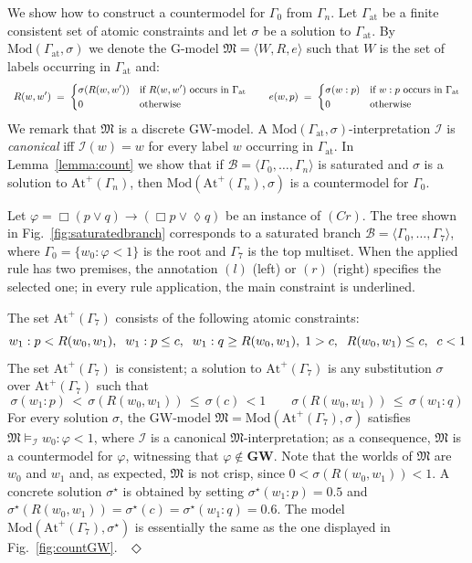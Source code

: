 \documentclass[copyright,creativecommons]{eptcs}
\newcommand{\GWL}{\mathbf{GW}}
\newcommand{\GM}{\mbox{$\mathrm{G}$}}
\newcommand{\GWM}{\mbox{$\mathrm{GW}$}}
\newcommand{\Diam}{\lozenge}
\newcommand{\Gat}{\G_\mathrm{at}}
\newcommand{\stru}[1]{\langle #1 \rangle} %
\newcommand{\Atmp}[1]{\mathrm{At}^{+}\!(#1)}
\newcommand{\Modname}{\mathrm{Mod}}
\newcommand{\Mod}[1]{\Modname(#1)}
\newcommand{\M}{\mathfrak{M}}
\newcommand{\s}{\sigma}
\newcommand{\G}{\Gamma}
\newcommand{\Bcal}{\mathcal{B}}
\newcommand{\Ical}{\mathcal{I}}
\newcommand{\EndEx}{\mbox{}~\hfill$\Diamond$}
\begin{document}
\noindent
We show how to construct a countermodel for $\G_0$ from $\G_n$.  Let
$\Gat$ be a finite consistent set of atomic constraints and let $\s$
be a solution to $\Gat$.  By $\Mod{\Gat,\sigma}$ we denote the
$\GM$-model $\M=\stru{W,R,e}$ such that $W$ is the set of labels
occurring in $\Gat$ and:
\[\small
\begin{array}{l}
  R(w,w') \;=\;
  \begin{cases}
    \s(R(w,w')) & \mbox{if $R(w,w')$ occurs in $\Gat$}  
    \\
    0 & \mbox{otherwise}
  \end{cases}
  \qquad
  e(w,p) \;=\;
  \begin{cases}
    \s(w:p) & \mbox{if $w:p$ occurs in $\Gat$}  
    \\
    0 & \mbox{otherwise}
  \end{cases}
\end{array}
\]
We remark that $\M$ is a discrete $\GWM$-model.  A
$\Mod{\Gat,\sigma}$-interpretation $\Ical$ is \emph{canonical} iff
$\Ical(w)=w$ for every label $w$ occurring in $\Gat$. In
Lemma~\ref{lemma:count} we show that if $\Bcal=\stru{\G_0,\dots,\G_n}$
is saturated and $\s$ is a solution to $\Atmp{\G_n}$, then
$\Mod{\Atmp{\G_n},\s}$ is a countermodel for $\G_0$.


\begin{example}\label{ex:satBrancj}
  Let $\varphi=\Box(p\lor q) \to (\Box p\lor \Diam q)$ be an instance
  of $(Cr)$.  The tree shown in Fig.~\ref{fig:saturatedbranch}
  corresponds to a saturated branch $\Bcal=\stru{\G_0,\dots,\G_7}$,
  where $\G_0=\{w_0:\varphi < 1\}$ is the root and $\G_7$ is the top
  multiset.  When the applied rule has two premises, the annotation
  $(l)$ (left) or $(r)$ (right) specifies the selected one; in every
  rule application, the main constraint is underlined.

  The set $\Atmp{\G_7}$ consists of the following atomic constraints:
  \[\small
  w_1:p<R(w_0,w_1),\;\; w_1:p\leq c, \;\; w_1 : q \geq R(w_0,w_1),\;
  1> c,\;\; R(w_0,w_1)\leq c,\;\; c < 1
  \]
  The set $\Atmp{\G_7}$ is consistent; a solution to $\Atmp{\G_7}$ is
  any substitution $\s$ over $\Atmp{\G_7}$ such that
  \[
  \sigma(w_1:p)\, < \,\sigma\left(R(w_0,w_1)\right)\,\leq\, \sigma(c) \,< 1
  \qquad
  \sigma\left(R(w_0,w_1)\right)\,\leq \, \sigma(w_1: q) %
  \]
  For every solution $\s$, the \GWM-model $\M=\Mod{\Atmp{\G_7},\s}$
  satisfies $\M \models_\Ical w_0 :\varphi < 1$, where $\Ical$ is a
  canonical $\M$-interpretation; as a consequence, $\M$ is a countermodel for
  $\varphi$, witnessing that $\varphi\not\in\GWL$.
  Note that the worlds of $\M$ are $w_0$ and $w_1$ and,
  as expected, $\M$ is not crisp, since $0 < \sigma(R(w_0,w_1)) < 1$.
    A concrete solution
  $\s^\star$ is obtained by setting $\sigma^\star(w_1:p) = 0.5$ and
  $\sigma^\star(R(w_0,w_1))= \sigma^\star(c) = \sigma^\star(w_1:q) =
  0.6$.  The model $\Mod{\Atmp{\G_7},\s^\star}$ is essentially the
  same as the one displayed in Fig.~\ref{fig:countGW}.
  \EndEx
\end{example}
\end{document}
